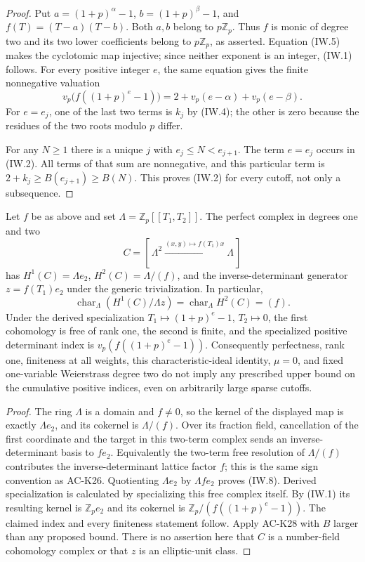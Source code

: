 \begin{proof}
Put $a=(1+p)^\alpha-1$, $b=(1+p)^\beta-1$, and
$f(T)=(T-a)(T-b)$.  Both $a,b$ belong to $p\mathbb Z_p$.
Thus $f$ is monic of degree two and its two lower
coefficients belong to $p\mathbb Z_p$, as asserted.
Equation (IW.5) makes the cyclotomic map injective;
since neither exponent is an integer, (IW.1) follows.
For every positive integer $e$, the same equation gives
the finite nonnegative valuation
\[
 v_p\bigl(f((1+p)^e-1)\bigr)
            =2+v_p(e-\alpha)+v_p(e-\beta).          \tag{IW.6}
\]
For $e=e_j$, one of the last two terms is $k_j$ by
(IW.4); the other is zero because the residues of the
two roots modulo $p$ differ.

For any $N\ge1$ there is a unique $j$ with
$e_j\le N<e_{j+1}$.  The term $e=e_j$ occurs in (IW.2).
All terms of that sum are nonnegative, and this particular
term is $2+k_j\ge B(e_{j+1})\ge B(N)$.
This proves (IW.2) for every cutoff, not only a subsequence.
\end{proof}

\begin{corollary}
\label{AC-K28-det}
Let $f$ be as above and set
$\Lambda=\mathbb Z_p[[T_1,T_2]]$.
The perfect complex in degrees one and two
\[
 C=[\,\Lambda^2\xrightarrow{(x,y)\mapsto f(T_1)x}\Lambda\,]
                                                        \tag{IW.7}
\]
has $H^1(C)=\Lambda e_2$, $H^2(C)=\Lambda/(f)$, and the
inverse-determinant generator $z=f(T_1)e_2$ under the
generic trivialization.  In particular,
\[
 \operatorname{char}_\Lambda(H^1(C)/\Lambda z)
                   =\operatorname{char}_\Lambda H^2(C)=(f).
                                                        \tag{IW.8}
\]
Under the derived specialization
$T_1\mapsto(1+p)^e-1$, $T_2\mapsto0$, the first
cohomology is free of rank one, the second is finite,
and the specialized positive determinant index is
$v_p(f((1+p)^e-1))$.
Consequently perfectness, rank one, finiteness at all
weights, this characteristic-ideal identity, $\mu=0$,
and fixed one-variable Weierstrass degree two do not
imply any prescribed upper bound on the cumulative
positive indices, even on arbitrarily large sparse cutoffs.
\end{corollary}
\begin{proof}
The ring $\Lambda$ is a domain and $f\ne0$, so the
kernel of the displayed map is exactly $\Lambda e_2$,
and its cokernel is $\Lambda/(f)$.  Over its fraction
field, cancellation of the first coordinate and the
target in this two-term complex sends an inverse-
determinant basis to $f e_2$.  Equivalently the
two-term free resolution of $\Lambda/(f)$ contributes
the inverse-determinant lattice factor $f$; this is
the same sign convention as AC-K26.  Quotienting
$\Lambda e_2$ by $\Lambda f e_2$ proves (IW.8).
Derived specialization is calculated by specializing
this free complex itself.  By (IW.1) its resulting
kernel is $\mathbb Z_p e_2$ and its cokernel is
$\mathbb Z_p/(f((1+p)^e-1))$.
The claimed index and every finiteness statement follow.
Apply AC-K28 with $B$ larger than any proposed bound.
There is no assertion here that $C$ is a number-field
cohomology complex or that $z$ is an elliptic-unit class.
\end{proof}


